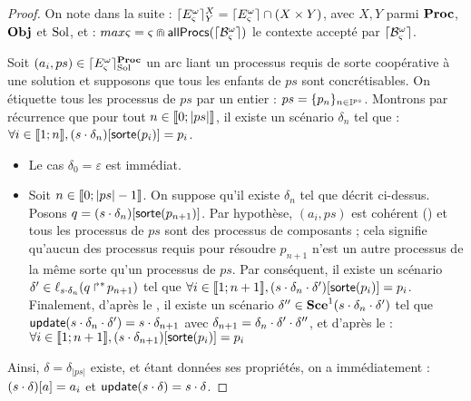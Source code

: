 \begin{proof} %
  On note dans la suite :
  $\lceil E_\varsigma^\omega\rceil^{X}_{Y} = \lceil E_\varsigma^\omega\rceil \cap (X \times Y)$, avec $X, Y$ parmi $\mathbf{Proc}$, $\mathbf{Obj}$ et $\mathrm{Sol}$,
  et : $max\varsigma = \varsigma \Cap \mathsf{allProcs}(\lceil \mathcal{B}_\varsigma^\omega\rceil)$ le contexte accepté par $\lceil \mathcal{B}_\varsigma^\omega\rceil$.
  
  Soit $(a_i, ps) \in \lceil E_\varsigma^\omega\rceil^{\mathbf{Proc}}_{\mathrm{Sol}}$ un arc liant un processus requis de sorte coopérative à
  une solution et supposons que tous les enfants de $ps$ sont concrétisables.
  On étiquette tous les processus de $ps$ par un entier : $ps = \{ p_n \}_{n \in \mathbb{I}^{ps}}$.
  Montrons par récurrence que pour tout $n \in \mathopen{\llbracket}0\mathclose{};|ps|\mathclose{\rrbracket}$,
  il existe un scénario $\delta_n$ tel que :
  $\forall i \in \mathopen{\llbracket}1\mathclose{};n\mathclose{\rrbracket}, {(s \cdot \delta_n)[\mathsf{sorte}(p_i)]} = p_i$.
  \begin{itemize}
    \item Le cas $\delta_0 = \varepsilon$ est immédiat.
    \item Soit $n \in \mathopen{\llbracket}0\mathclose{};|ps| - 1\mathclose{\rrbracket}$.
      On suppose qu'il existe $\delta_n$ tel que décrit ci-dessus.
      Posons $q = {(s \cdot \delta_n)[\mathsf{sorte}(p_{n+1})]}$.
      Par hypothèse, $(a_i, ps)$ est cohérent () et tous les processus
      de $ps$ sont des processus de composants ;
      cela signifie qu'aucun des processus requis pour résoudre $p_{n+1}$ n'est un autre processus
      de la même sorte qu'un processus de $ps$.
      Par conséquent, il existe un scénario
      $\delta' \in \ell_{s \cdot \delta_n}(\mbox{$q\Rsh^*\!p_{n+1}$})$
      tel que $\forall i \in \mathopen{\llbracket}1\mathclose{};n+1\mathclose{\rrbracket},
        {(s \cdot \delta_n \cdot \delta')[\mathsf{sorte}(p_{i})]} = p_{i}$.
      Finalement, d'après le , il existe un scénario
      $\delta'' \in \mathbf{Sce}^1(s \cdot \delta_n \cdot \delta')$
      tel que $\mathsf{update}(s \cdot \delta_n \cdot \delta') = s \cdot \delta_{n+1}$
      avec $\delta_{n+1} = \delta_n \cdot \delta' \cdot \delta''$,
      et d'après le  :
      $\forall i \in \mathopen{\llbracket}1\mathclose{};n+1\mathclose{\rrbracket}, {(s \cdot \delta_{n+1})[\mathsf{sorte}(p_i)]} = p_i$
  \end{itemize}
  Ainsi, $\delta = \delta_{|ps|}$ existe, et étant données ses propriétés, on a immédiatement :
  ${(s \cdot \delta)[a]} = a_i$ et $\mathsf{update}(s \cdot \delta) = s \cdot \delta$.
  

\end{proof}
